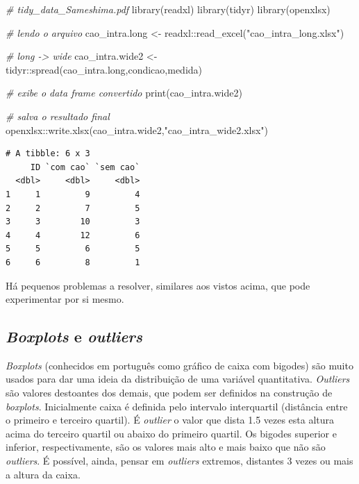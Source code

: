 \documentclass[
]{article}
\newenvironment{Shaded}{\begin{snugshade}}{\end{snugshade}}
\newcommand{\CommentTok}[1]{\textcolor[rgb]{0.56,0.35,0.01}{\textit{#1}}}
\newcommand{\FunctionTok}[1]{\textcolor[rgb]{0.00,0.00,0.00}{#1}}
\newcommand{\NormalTok}[1]{#1}
\newcommand{\OtherTok}[1]{\textcolor[rgb]{0.56,0.35,0.01}{#1}}
\newcommand{\SpecialCharTok}[1]{\textcolor[rgb]{0.00,0.00,0.00}{#1}}
\newcommand{\StringTok}[1]{\textcolor[rgb]{0.31,0.60,0.02}{#1}}
\begin{document}
\begin{Shaded}
\begin{Highlighting}[]
\CommentTok{\# tidy\_data\_Sameshima.pdf}
\FunctionTok{library}\NormalTok{(readxl)}
\FunctionTok{library}\NormalTok{(tidyr)}
\FunctionTok{library}\NormalTok{(openxlsx)}

\CommentTok{\# lendo o arquivo}
\NormalTok{cao\_intra.long }\OtherTok{\textless{}{-}}\NormalTok{ readxl}\SpecialCharTok{::}\FunctionTok{read\_excel}\NormalTok{(}\StringTok{"cao\_intra\_long.xlsx"}\NormalTok{)}

\CommentTok{\# long {-}\textgreater{} wide}
\NormalTok{cao\_intra.wide2 }\OtherTok{\textless{}{-}}\NormalTok{ tidyr}\SpecialCharTok{::}\FunctionTok{spread}\NormalTok{(cao\_intra.long,condicao,medida)}

\CommentTok{\# exibe o data frame convertido}
\FunctionTok{print}\NormalTok{(cao\_intra.wide2)}

\CommentTok{\# salva o resultado final}
\NormalTok{openxlsx}\SpecialCharTok{::}\FunctionTok{write.xlsx}\NormalTok{(cao\_intra.wide2,}\StringTok{"cao\_intra\_wide2.xlsx"}\NormalTok{)}
\end{Highlighting}
\end{Shaded}

\begin{verbatim}
# A tibble: 6 x 3
     ID `com cao` `sem cao`
  <dbl>     <dbl>     <dbl>
1     1         9         4
2     2         7         5
3     3        10         3
4     4        12         6
5     5         6         5
6     6         8         1
\end{verbatim}

Há pequenos problemas a resolver, similares aos vistos acima, que pode
experimentar por si mesmo.

\hypertarget{boxplots-e-outliers}{%
\subsection{\texorpdfstring{\emph{Boxplots} e
\emph{outliers}}{Boxplots e outliers}}\label{boxplots-e-outliers}}

\emph{Boxplots} (conhecidos em português como gráfico de caixa com
bigodes) são muito usados para dar uma ideia da distribuição de uma
variável quantitativa. \emph{Outliers} são valores destoantes dos
demais, que podem ser definidos na construção de \emph{boxplots}.
Inicialmente caixa é definida pelo intervalo interquartil (distância
entre o primeiro e terceiro quartil). É \emph{outlier} o valor que dista
1.5 vezes esta altura acima do terceiro quartil ou abaixo do primeiro
quartil. Os bigodes superior e inferior, respectivamente, são os valores
mais alto e mais baixo que não são \emph{outliers}. É possível, ainda,
pensar em \emph{outliers} extremos, distantes 3 vezes ou mais a altura
da caixa.
\end{document}
